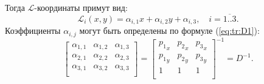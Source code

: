 \documentclass[a4paper,14pt]{article}
\begin{document}
\noindent Тогда $\mathcal{L}$-координаты примут вид:
\begin{equation*}
	\mathcal{L}_i (x, y) = \alpha_{i, 1} x + \alpha_{i, 2} y + \alpha_{i, 3} , \text{~~~} i = \overline{1..3} . \label{eq:tr:L}
\end{equation*}
Коэффициенты $\alpha_{i, j}$ могут быть определены по формуле (\ref{eq:tr:D1}):
\begin{equation}
	\left[
	\begin{matrix}
		\alpha_{1, 1} & \alpha_{1, 2} & \alpha_{1, 3} \\
		\alpha_{2, 1} & \alpha_{2, 2} & \alpha_{2, 3} \\
		\alpha_{3, 1} & \alpha_{3, 2} & \alpha_{3, 3} \\
	\end{matrix}
	\right] = \left[
	\begin{matrix}
		{p_1}_x & {p_2}_x & {p_3}_x \\
		{p_1}_y & {p_2}_y & {p_3}_y \\
		1 & 1 & 1 \\
	\end{matrix}
	\right]^{-1} = D^{-1} . \label{eq:tr:D1}
\end{equation}
\end{document}
